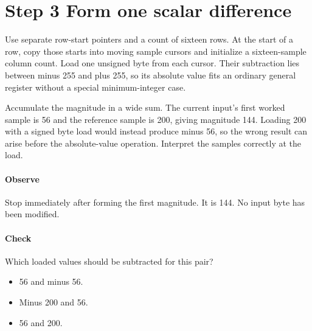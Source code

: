 \section{Step 3 Form one scalar difference}\label{h263-sad-s03}
Use separate row-start pointers and a count of sixteen rows. At the start of a
row, copy those starts into moving sample cursors and initialize a sixteen-sample
column count. Load one unsigned byte from each cursor. Their subtraction lies
between minus 255 and plus 255, so its absolute value fits an ordinary general
register without a special minimum-integer case.

Accumulate the magnitude in a wide sum. The current input's first worked sample
is 56 and the reference sample is 200, giving magnitude 144. Loading 200 with a
signed byte load would instead produce minus 56, so the wrong result can arise
before the absolute-value operation. Interpret the samples correctly at the load.

\paragraph{Observe} Stop immediately after forming the first magnitude. It is
144. No input byte has been modified.
\paragraph{Check} Which loaded values should be subtracted for this pair?
\begin{itemize}
  \item[A.] 56 and minus 56.
  \item[B.] Minus 200 and 56.
  \item[C.] 56 and 200.
\end{itemize}
